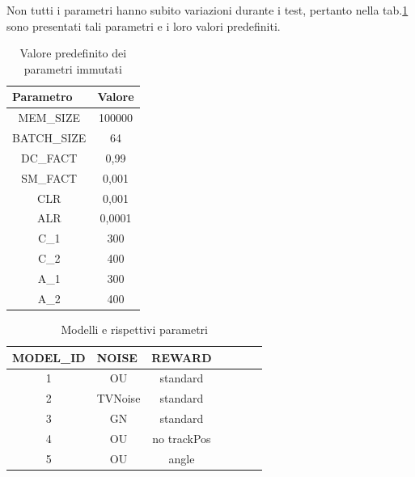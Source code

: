 Non tutti i parametri hanno subito variazioni durante i test, pertanto nella tab.\ref{tab:predef_value} sono presentati tali parametri e i loro valori predefiniti.

\begin{table}[hb]
\centering
\begin{tabular}{|c|c|}
\hline
\multicolumn{1}{|l|}{\textbf{Parametro}} & \multicolumn{1}{l|}{\textbf{Valore}} \\ \hline
MEM\_SIZE                                 & 100000                               \\ \hline
BATCH\_SIZE                               & 64                                   \\ \hline
DC\_FACT                                  & 0,99                                 \\ \hline
SM\_FACT                                  & 0,001                                \\ \hline
CLR                                      & 0,001                                \\ \hline
ALR                                      & 0,0001                               \\ \hline
C\_1                                      & 300                               \\ \hline
C\_2                                      & 400                               \\ \hline
A\_1                                      & 300                               \\ \hline
A\_2                                      & 400                               \\ \hline
\end{tabular}
\caption{Valore predefinito dei parametri immutati}
\label{tab:predef_value}
\end{table}

\begin{table}[hb]
\centering
\begin{tabular}{|c|c|c|c|c|c|c|}
\hline
\multicolumn{1}{|l|}{\textbf{MODEL\_ID}} &
  \multicolumn{1}{l|}{\textbf{NOISE}} &
  \multicolumn{1}{l|}{\textbf{REWARD}} \\ \hline
1 & OU      & standard    \\ \hline
2 & TVNoise & standard    \\ \hline
3 & GN      & standard    \\ \hline
4 & OU      & no trackPos \\ \hline
5 & OU      & angle       \\ \hline
\end{tabular}
\caption{Modelli e rispettivi parametri}
\label{tab:tests}
\end{table}

